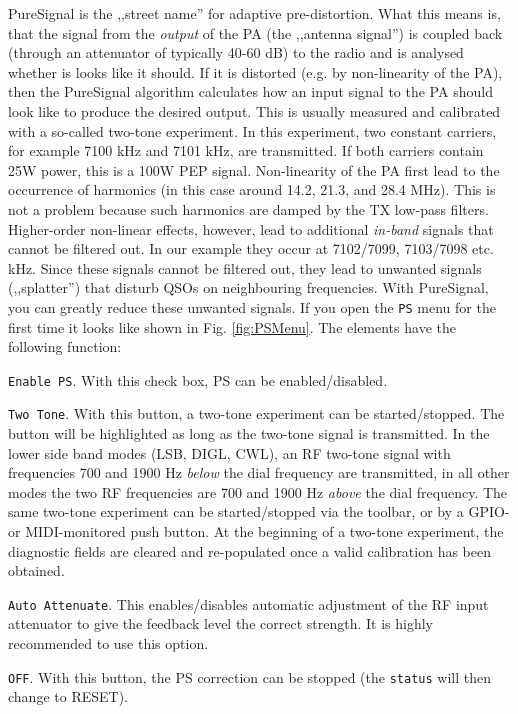 \documentclass[12pt]{book}
\def\rett#1{\texttt{\color{red}#1}}
\def\bltt#1{\texttt{\color{blue}#1}}
\begin{document}
PureSignal is the ,,street name'' for adaptive pre-distortion. What this means is, that
the signal from the \textit{output} of the PA (the ,,antenna signal'') is coupled
back (through an attenuator of typically 40-60 dB) to the radio and is analysed
whether is looks like it should. If it is distorted (e.g. by non-linearity of the PA),
then the PureSignal algorithm calculates how an input signal to the PA should look like
to produce the desired output. This is usually measured and calibrated with a so-called
two-tone experiment. In this experiment, two constant carriers, for example 7100 kHz
and 7101 kHz, are transmitted. If both carriers contain 25W power, this is
a 100W PEP signal. Non-linearity of the PA first lead to the occurrence of harmonics
(in this case around 14.2, 21.3, and 28.4 MHz). This is not a problem because
such harmonics are  damped by the TX low-pass filters. Higher-order non-linear effects,
however, lead to additional \textit{in-band} signals that cannot be filtered out.
In our example they occur at
7102/7099, 7103/7098 etc. kHz. Since these signals cannot be filtered out,
they lead to unwanted signals (,,splatter'') that disturb QSOs on neighbouring
frequencies. With PureSignal, you can greatly reduce these unwanted signals.
If you open the \bltt{PS} menu for the first time it looks like shown in Fig.
\ref{fig:PSMenu}.
The elements have the following function:

\rett{Enable PS}. With this check box, PS can be enabled/disabled.

\rett{Two Tone}. With this button, a two-tone experiment can be started/stopped. The button
will be highlighted as long as the two-tone signal is transmitted. In the lower side band
modes (LSB, DIGL, CWL), an RF two-tone signal with frequencies 700 and 1900 Hz
\textit{below} the dial frequency are transmitted, in all other modes the two
RF frequencies are 700 and 1900 Hz \textit{above} the dial frequency. The same two-tone
experiment can be started/stopped via the toolbar, or by a GPIO- or MIDI-monitored
push button. At the beginning of a two-tone experiment, the diagnostic fields
are cleared and re-populated once a valid calibration has been obtained.

\rett{Auto Attenuate}. This enables/disables automatic adjustment of the RF input
attenuator to give the feedback level the correct strength. It is highly recommended
to use this option.

\rett{OFF}. With this button, the PS correction can be stopped (the \rett{status} will
then change to RESET).
\end{document}
